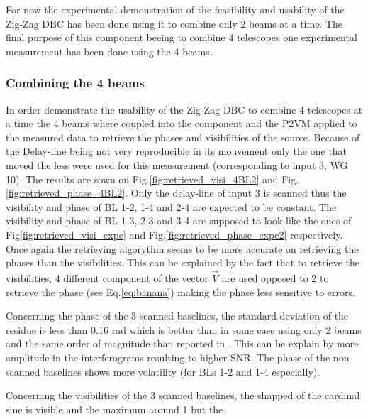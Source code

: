For now the experimental demonstration of the feasibility and usability of the Zig-Zag DBC has been done using it to combine only 2 beams at a time. The final purpose of this component beeing to combine 4 telescopes one experimental measurement has been done using the 4 beams.

\subsubsection{Combining the 4 beams}
In order demonstrate the usability of the Zig-Zag DBC to combine 4 telescopes at a time the 4 beams where coupled into the component and the P2VM applied to the measured data to retrieve the phases and visibilities of the source. Because of the Delay-line being not very reproducible in its mouvement only the one that moved the less were used for this measurement (corresponding to input 3, WG 10). The results are sown on Fig.\ref{fig:retrieved_visi_4BL2} and Fig.\ref{fig:retrieved_phase_4BL2}. Only the delay-line of input 3 is scanned thus the visibility and phase of BL 1-2, 1-4 and 2-4 are expected to be constant. The visibility and phase of BL 1-3, 2-3 and 3-4 are supposed to look like the ones of Fig\ref{fig:retrieved_visi_expe}  and Fig.\ref{fig:retrieved_phase_expe2} respectively. Once again the retrieving algorythm seems to be more accurate on retrieving the phases than the visibilities. This can be explained by the fact that to retrieve the visibilities, 4 different component of the vector $\vec{V}$ are used opposed to 2 to retrieve the phase (see Eq.\ref{eq:banana}) making the phase less sensitive to errors.

Concerning the phase of the 3 scanned baselines, the standard deviation of the residue is less than 0.16 rad which is better than in some case using only 2 beams and the same order of magnitude than reported in \cite{Diener2017}. This can be explain by more amplitude in the interferograms  resulting to higher SNR. The phase of the non scanned baselines shows more volatility (for BLs 1-2 and 1-4 especially). 

Concerning the visibilities of the 3 scanned baselines, the shapped of the cardinal sine is visible and the maximum around 1 but the 

